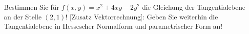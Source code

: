 \item Bestimmen Sie für $f(x,y) = x^2 + 4xy -2y^2$ die Gleichung der Tangentialebene an der Stelle $(2,1)$! [Zusatz Vektorrechnung]: Geben Sie weiterhin die Tangentialebene in Hessescher Normalform und parametrischer Form an!
